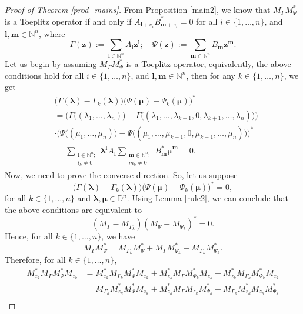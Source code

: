\documentclass[12pt]{amsart}
\theoremstyle{definition}
\newcommand{\Nat}{\mathbb{N}}
\newcommand{\D}{\mathbb{D}}
\newcommand{\1}{{\mbox{\bf 1}}}
\begin{document}
\begin{proof}[Proof of Theorem \ref{prod_mains}]
From Proposition \ref{main2}, we know that $M_{\Gamma} M_{\Psi}^*$ is a Toeplitz operator if and only if  $A_{\bm{l}+e_{i}} B_{\bm{m}+e_i}^* = 0$ for all $i \in \{1,\ldots,n\}$, and $\bm{l}, \bm{m} \in \Nat^n$, where 
\[
\Gamma(\bm{z}):= \sum_{\bm{l} \in \Nat^n} A_{\bm{l}} \bm{z}^{\bm{l}} ; \quad \Psi(\bm{z}):= \sum_{\bm{m} \in \Nat^n} B_{\bm{m}} \bm{z}^{\bm{m}} .
\]
Let us begin by assuming $M_{\Gamma} M_{\Psi}^*$ is a Toeplitz operator, equivalently, the above conditions hold for all $i \in \{1,\ldots,n\}$, and $\bm{l}, \bm{m} \in \Nat^n$,
then for any $k \in \{1,\ldots,n\}$, we get
\begin{equation*}
\begin{split}
&\big( \Gamma(\bm{\lambda}) - \Gamma_k(\bm{\lambda}) \big) \big( \Psi(\bm{\mu}) - \Psi_k(\bm{\mu})\big)^*\\
&=\Big(\Gamma\big((\lambda_1,\ldots,\lambda_n)\big) - \Gamma\big((\lambda_{1},\ldots,\lambda_{k-1}, 0, \lambda_{k+1},\ldots,\lambda_n)\big) \Big)\\
&\cdot \Big( \Psi\big((\mu_{1},\ldots,\mu_n)\big) - \Psi\big((\mu_{1},\ldots,\mu_{k-1}, 0, \mu_{k+1},\ldots,\mu_n) \big)\Big)^* \\
&= \sum_{\substack{\bm{l} \in \Nat^n; \\ l_{k} \neq 0}}  \bm{\lambda}^{\bm{l}} A_{\bm{l}}  \sum_{\substack{\bm{m} \in \Nat^n; \\ m_{k} \neq 0}} B_{\bm{m}}^* \bar{\bm{\mu}}^{\bm{m}} =0.
\end{split}
\end{equation*}
Now, we need to prove the converse direction. So, let us suppose
\[
\big( \Gamma(\bm{\lambda}) - \Gamma_k(\bm{\lambda}) \big) \big( \Psi(\bm{\mu}) - \Psi_k(\bm{\mu})\big)^*=0,
\]
for all $k \in \{1,\ldots,n\}$ and $\bm{\lambda}, \bm{\mu} \in \D^n$.  Using Lemma \ref{rule2}, we can conclude that the above conditions are equivalent to
\[
(M_{\Gamma} - M_{\Gamma_k}) (M_{\Psi} - M_{\Psi_k})^* = 0.
\]
Hence, for all $k \in \{1,\ldots,n\}$, we have
\[
M_{\Gamma}M_{\Psi}^* = M_{\Gamma_k} M_{\Psi}^* + M_{\Gamma} M_{\Psi_k}^* - M_{\Gamma_k}M_{\Psi_k}^*.
\]
Therefore, for all $k \in \{1,\ldots,n\}$,
\begin{align*}
M_{z_k}^* M_{\Gamma}M_{\Psi}^* M_{z_k} &= M_{z_k}^* M_{\Gamma_k} M_{\Psi}^* M_{z_k} + M_{z_k}^*M_{\Gamma} M_{\Psi_k}^* M_{z_k} - M_{z_k}^*M_{\Gamma_k}M_{\Psi_k}^* M_{z_k}\\
&= M_{\Gamma_k} M_{z_k}^* M_{\Psi}^* M_{z_k} + M_{z_k}^*M_{\Gamma} M_{z_k} M_{\Psi_k}^*  - M_{\Gamma_k} M_{z_k}^* M_{z_k} M_{\Psi_k}^* \\

\end{align*}
\end{proof}
\end{document}
